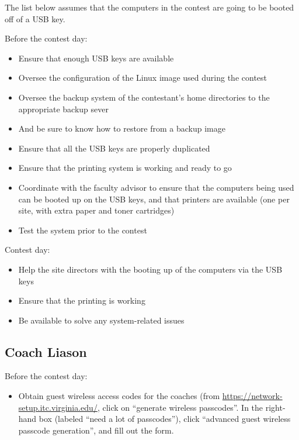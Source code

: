 \documentclass[11pt,twoside,letterpaper]{book}
\newenvironment{itemlist}{
\begin{itemize}
\setlength{\itemsep}{0pt}
\setlength{\parskip}{0pt}}
{\end{itemize}}
\begin{document}
\noindent The list below assumes that the computers in the contest are
going to be booted off of a USB key.

\noindent Before the contest day:

\begin{itemlist}
\item Ensure that enough USB keys are available
\item Oversee the configuration of the Linux image used during the
  contest
\item Oversee the backup system of the contestant's home directories
  to the appropriate backup sever
\item And be sure to know how to restore from a backup image
\item Ensure that all the USB keys are properly duplicated
\item Ensure that the printing system is working and ready to go
\item Coordinate with the faculty advisor to ensure that the computers
  being used can be booted up on the USB keys, and that printers are
  available (one per site, with extra paper and toner cartridges)
\item Test the system prior to the contest
\end{itemlist}

\noindent Contest day:

\begin{itemlist}
\item Help the site directors with the booting up of the computers via
  the USB keys
\item Ensure that the printing is working
\item Be available to solve any system-related issues
\end{itemlist}


\subsection{Coach Liason}

\noindent Before the contest day:

\begin{itemlist}
\item Obtain guest wireless access codes for the coaches (from
  \url{https://network-setup.itc.virginia.edu/}, click on ``generate
  wireless passcodes''.  In the right-hand box (labeled ``need a lot
  of passcodes''), click ``advanced guest wireless passcode
  generation'', and fill out the form.
\end{itemlist}
\end{document}
